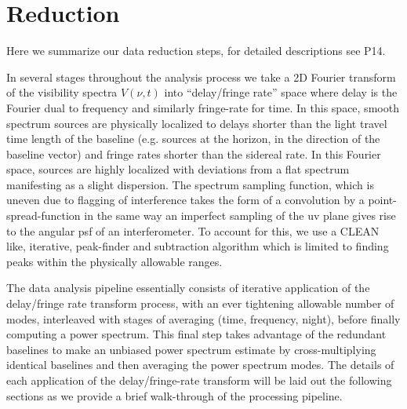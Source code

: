 \documentclass[preprint]{aastex}
\begin{document}
\section{Reduction}
\label{sec:obs_meth}
Here we summarize our data reduction steps, for detailed descriptions see P14.

In several stages throughout the analysis process we take a 2D Fourier transform of the visibility spectra $V(\nu,t)$ into ``delay/fringe rate'' space where delay is the Fourier dual to frequency and similarly fringe-rate for time.  In this space, smooth spectrum sources are physically localized to delays shorter than the light travel time length of the baseline (e.g. sources at the horizon, in the direction of the baseline vector) and fringe rates shorter than the sidereal rate.  In this Fourier space, sources are highly localized with deviations from a flat spectrum manifesting as a slight dispersion. The spectrum sampling function, which is uneven due to flagging of interference takes the form of a convolution by a point-spread-function in the same way an imperfect sampling of the uv plane gives rise to the angular psf of an interferometer.  To account for this, we use a CLEAN like, iterative, peak-finder and subtraction algorithm which is limited to finding peaks within the physically allowable ranges.

The data analysis pipeline essentially consists of iterative application of the delay/fringe rate transform process, with an ever tightening allowable number of modes, interleaved with stages of averaging (time, frequency, night), before finally computing a power spectrum.  This final step takes advantage of the redundant baselines to make an unbiased power spectrum estimate by cross-multiplying identical baselines and then averaging the power spectrum modes.  The details of each application of the delay/fringe-rate transform will be laid out the following sections as we provide a brief walk-through of the processing pipeline.
\end{document}
